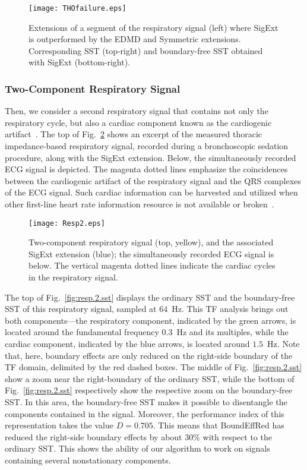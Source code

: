 \begin{figure}
\centering
\texttt{[image: THOfailure.eps]}
\caption{Extensions of a segment of the respiratory signal (left) where {\sf SigExt} is outperformed by the EDMD and Symmetric extensions. Corresponding SST (top-right) and boundary-free SST obtained with {\sf SigExt} (bottom-right).}
\label{fig:THO.failure}
\end{figure}


\subsubsection{Two-Component Respiratory Signal}
Then, we consider a second respiratory signal that contains not only the respiratory cycle, but also a cardiac component known as the cardiogenic artifact~\cite{Smith94recognition}. The top of Fig.~\ref{fig:resp.2} shows an excerpt of the measured thoracic impedance-based respiratory signal, recorded during a bronchoscopic sedation procedure, along with the {\sf SigExt} extension. Below, the simultaneously recorded ECG signal is depicted. The magenta dotted lines emphasize the coincidences between the cardiogenic artifact of the respiratory signal and the QRS complexes of the ECG signal. Such cardiac information can be harvested and utilized when other first-line heart rate information resource is not available or broken~\cite{Lu19recycling}.

\begin{figure}
\centering
\texttt{[image: Resp2.eps]}
\caption{Two-component respiratory signal (top, yellow), and the associated {\sf SigExt} extension (blue); the simultaneously recorded ECG signal is below. The vertical magenta dotted lines indicate the cardiac cycles in the respiratory signal.}
\label{fig:resp.2}
\end{figure}

The top of Fig.~\ref{fig:resp.2.sst} displays the ordinary SST and the boundary-free SST of this respiratory signal, sampled at $64$~Hz. This TF analysis brings out both components---the respiratory component, indicated by the green arrows, is located around the fundamental frequency $0.3$~Hz and its multiples, while the cardiac component, indicated by the blue arrows, is located around $1.5$~Hz. Note that, here, boundary effects are only reduced on the right-side boundary of the TF domain, delimited by the red dashed boxes. The middle of Fig.~\ref{fig:resp.2.sst} show a zoom near the right-boundary of the ordinary SST, while the bottom of Fig.~\ref{fig:resp.2.sst} respectively show the respective zoom on the boundary-free SST. In this area, the boundary-free SST makes it possible to disentangle the components contained in the signal. Moreover, the performance index of this representation takes the value $D=0.705$. This means that {\sf BoundEffRed} has reduced the right-side boundary effects by about $30\%$ with respect to the ordinary SST. This shows the ability of our algorithm to work on signals containing several nonstationary components.

